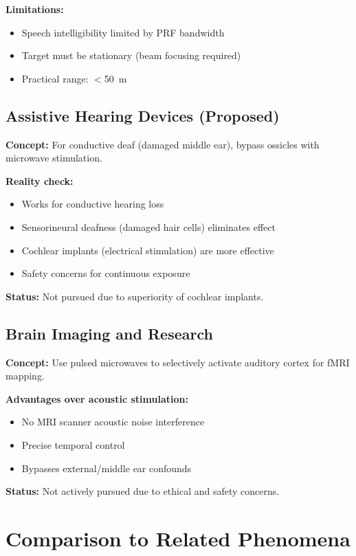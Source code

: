 \textbf{Limitations:}
\begin{itemize}
\item Speech intelligibility limited by PRF bandwidth
\item Target must be stationary (beam focusing required)
\item Practical range: $<$50~m
\end{itemize}

\subsection{Assistive Hearing Devices (Proposed)}

\textbf{Concept:} For conductive deaf (damaged middle ear), bypass ossicles with microwave stimulation.

\textbf{Reality check:}
\begin{itemize}
\item[\checkmark] Works for conductive hearing loss
\item[\texttimes] Sensorineural deafness (damaged hair cells) eliminates effect
\item[\texttimes] Cochlear implants (electrical stimulation) are more effective
\item[\texttimes] Safety concerns for continuous exposure
\end{itemize}

\textbf{Status:} Not pursued due to superiority of cochlear implants.

\subsection{Brain Imaging and Research}

\textbf{Concept:} Use pulsed microwaves to selectively activate auditory cortex for fMRI mapping.

\textbf{Advantages over acoustic stimulation:}
\begin{itemize}
\item No MRI scanner acoustic noise interference
\item Precise temporal control
\item Bypasses external/middle ear confounds
\end{itemize}

\textbf{Status:} Not actively pursued due to ethical and safety concerns.

\section{Comparison to Related Phenomena}


